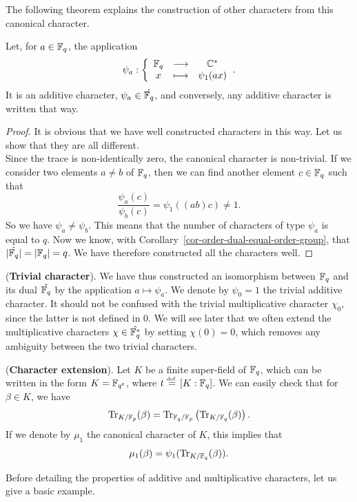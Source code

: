The following theorem explains the construction of other characters from this canonical character.
 
\begin{prop}
\label{prop-characters-any-additives}
Let, for $ a \in \mathbb{F}_q $, the application
\begin{equation*}
\psi_a: {\left\{ \begin{array}{ccc} \mathbb{F}_q & \longrightarrow & \mathbb{C}^* \\ x & \longmapsto & \psi_1 (ax) \end{array} \right.}.
\end{equation*}
It is an additive character, $ \psi_a \in \hat{\mathbb{F}_q} $, and conversely, any additive character is written that way.
\end{prop}
 
\begin{proof}
It is obvious that we have well constructed characters in this way. Let us show that they are all different. \\Since the trace is non-identically zero, the canonical character is non-trivial. If we consider two elements $ a \neq b $ of $ \mathbb{F}_q $, then we can find another element $ c \in \mathbb{F}_q $ such that
\begin{equation*}
\frac{\psi_a (c)}{\psi_b (c)} = \psi_1 \left((ab) c \right) \neq 1.
\end{equation*}
So we have $ \psi_a \neq \psi_b $. This means that the number of characters of type $ \psi_a $ is equal to $ q $. Now we know, with Corollary~\ref{cor-order-dual-equal-order-group}, that $ | \hat{\mathbb{F}_q} | = | \mathbb{F}_q | = q $. We have therefore constructed all the characters well.
\end{proof}
 
 
\begin{rem}{(\upshape \textbf{Trivial character}).} 
 We have thus constructed an isomorphism between $ \mathbb{F}_q $ and its dual $ \hat{\mathbb{F}_q} $ by the application $ a \mapsto \psi_a $. We denote by $ \psi_0 = 1 $ the trivial additive character. It should not be confused with the trivial multiplicative character $ \chi_0 $, since the latter is not defined in $ 0 $. We will see later that we often extend the multiplicative characters $ \chi \in \hat{\mathbb{F}_q^*} $ by setting $ \chi (0) = 0 $, which removes any ambiguity between the two trivial characters.
\end{rem}
 
 
\begin{rem}{(\upshape \textbf{Character extension}).} 
Let $ K $ be a finite super-field of $ \mathbb{F}_q $, which can be written in the form $ K = \mathbb{F}_{q^t} $, where $ t \stackrel{\mbox{\upshape\tiny def.}}{=} [K: \mathbb{F}_q] $. We can easily check that for $ \beta \in K $, we have
\begin{equation*}
\operatorname{Tr}_{K / \mathbb{F}_p} (\beta) = \operatorname{Tr}_{\mathbb{F}_q / \mathbb{F}_p} \left(\operatorname{Tr}_{K / \mathbb{F}_q} (\beta) \right).
\end{equation*}
If we denote by $ \mu_1 $ the canonical character of $ K $, this implies that
\begin{equation}
\label{eq-formula-extension-canonical-car}
\mu_1 (\beta) = \psi_1 (\operatorname{Tr}_{K / \mathbb{F}_q} (\beta)).
\end{equation}
\end{rem}
Before detailing the properties of additive and multiplicative characters, let us give a basic example.
 
